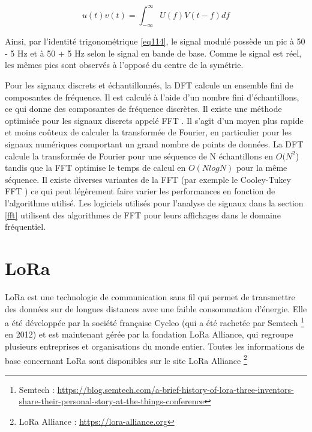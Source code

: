 \begin{equation}
u(t)v(t) = \int_{-\infty}^{\infty} U(f)V(t - f) df
\end{equation}

Ainsi, par l'identité trigonométrique \ref{eq114}, le signal modulé possède un pic à 50 - 5 Hz et à 50 + 5 Hz selon le signal en bande de base. Comme le signal est réel, les mêmes pics sont observés à l'opposé du centre de la symétrie.

\vspace{0.1cm}

Pour les signaux discrets et échantillonnés, la \ac{DFT} calcule un ensemble fini de composantes de fréquence. Il est calculé à l’aide d’un nombre fini d’échantillons, ce qui donne des composantes de fréquence discrètes. Il existe une méthode optimisée pour les signaux discrets appelé \ac{FFT} \cite{fft}. Il s'agit d'un moyen plus rapide et moins coûteux de calculer la transformée de Fourier, en particulier pour les signaux numériques comportant un grand nombre de points de données. La \ac{DFT} calcule la transformée de Fourier pour une séquence de N échantillons en $O(N^2$) tandis que la \ac{FFT} optimise le temps de calcul en $O(N log N)$ pour la même séquence. Il existe diverses variantes de la \ac{FFT} (par exemple le Cooley-Tukey FFT \cite{fft1}) ce qui peut légèrement faire varier les performances en fonction de l'algorithme utilisé. Les logiciels utilisés pour l'analyse de signaux dans la section \ref{fft} utilisent des algorithmes de \ac{FFT} pour leurs affichages dans le domaine fréquentiel.

\newpage

\section{LoRa}

\ac{LoRa} est une technologie de communication sans fil qui permet de transmettre des données sur de longues distances avec une faible consommation d'énergie. Elle a été développée par la société française Cycleo (qui a été rachetée par Semtech \footnote{Semtech : \href{https://blog.semtech.com/a-brief-history-of-lora-three-inventors-share-their-personal-story-at-the-things-conference}{https://blog.semtech.com/a-brief-history-of-lora-three-inventors-share-their-personal-story-at-the-things-conference}} en 2012) et est maintenant gérée par la fondation LoRa Alliance, qui regroupe plusieurs entreprises et organisations du monde entier. Toutes les informations de base concernant LoRa sont disponibles sur le site LoRa Alliance \footnote{LoRa Alliance : \href{https://lora-alliance.org}{https://lora-alliance.org}}

